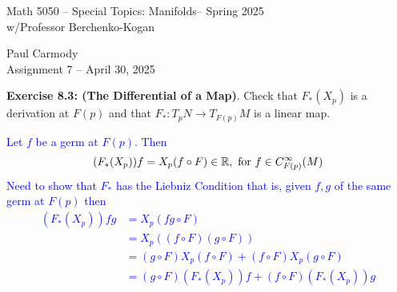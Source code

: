 \documentclass[10pt,a4paper]{report}
\newcommand{\CLASSNAME}{Math 5050 -- Special Topics: Manifolds}
\newcommand{\STUDENTNAME}{Paul Carmody}
\newcommand{\ASSIGNMENT}{Assignment 7 }
\newcommand{\DUEDATE}{April 30, 2025}
\newcommand{\SEMESTER}{Spring 2025}
\newcommand{\BLUE}[1]{\textcolor{blue}{#1}}
\begin{document}
\begin{center}
	\Large{\CLASSNAME -- \SEMESTER} \\
	\large{ w/Professor Berchenko-Kogan}
\end{center}
\begin{center}
	\STUDENTNAME \\
	\ASSIGNMENT -- \DUEDATE\\
\end{center} 

\noindent\textbf{Exercise 8.3: (The Differential of a Map)}.  Check that $F_*(X_p)$ is a derivation at $F(p)$ and that $F_*:T_pN\to T_{F(p)}M$ is a linear map.

\BLUE{Let $f$ be a germ at $F(p)$. Then
\begin{align*}
	(F_*(X_p))f = X_p(f \circ F)\in \mathbb{R}, \text{ for } f \in C^\infty_{F(p)}(M)
\end{align*}Need to show that $F_*$ has the Liebniz Condition that is, given $f,g$ of the same germ at $F(p)$ then
\begin{align*}
	(F_*(X_p))fg &= X_p(fg \circ F) \\
	&= X_p((f \circ F)(g\circ F)) \\
	&= (g \circ F)X_p(f \circ F) + (f\circ F)X_p(g\circ F) \\
	&= (g \circ F)(F_*(X_p))f + (f\circ F)(F_*(X_p))g 
\end{align*}
}
\end{document}
